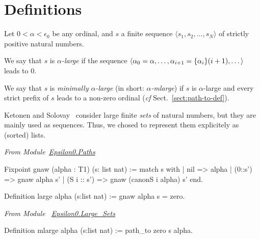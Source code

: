 \section{Definitions}


\begin{definition}
Let $0<\alpha<\epsilon_0$ be any ordinal, and $s$ a finite sequence $\langle s_1, s_2, \dots, s_N\rangle$ of strictly positive natural numbers. 

We say that $s$ is \emph{$\alpha$-large} if the sequence $\langle \alpha_0=\alpha,\dots,\alpha_{i+1}=\mbox{$\{\alpha_i\}(i+1)$},\dots \rangle$ leads to $0$. 

We say that $s$ is \emph{minimally $\alpha$-large} (in short:
\emph{$\alpha$-mlarge}) if $s$ is $\alpha$-large 
 and every strict prefix of $s$ leads to a non-zero ordinal (\emph{cf} Sect.~\vref{sect:path-to-def}).


\end{definition}



\begin{remark}
  Ketonen and Solovay~\cite{KS81} consider  large finite \emph{sets} of natural numbers,  but they are mainly used as sequences. Thus, we chosed to represent them explicitely as (sorted) lists. 


\noindent
\emph{From Module~\href{../theories/html/hydras.Epsilon0.Paths.html\#gnaw}{Epsilon0.Paths}}

\begin{Coqsrc}
Fixpoint gnaw (alpha : T1) (s: list nat) :=
  match s with
    | nil => alpha
    | (0::s') => gnaw  alpha s'
    | (S i :: s')  =>  gnaw (canonS i alpha) s'
  end.

Definition large alpha (s:list nat) := gnaw alpha s = zero.
\end{Coqsrc}

\vspace{4pt}

\noindent
\emph{From Module~ \href{../theories/html/hydras.Epsilon0.Large_Sets.html\#mlarge}{Epsilon0.Large\_Sets}}


\begin{Coqsrc}
Definition mlarge alpha (s:list nat) := path_to zero s alpha.
\end{Coqsrc}


\end{remark}



